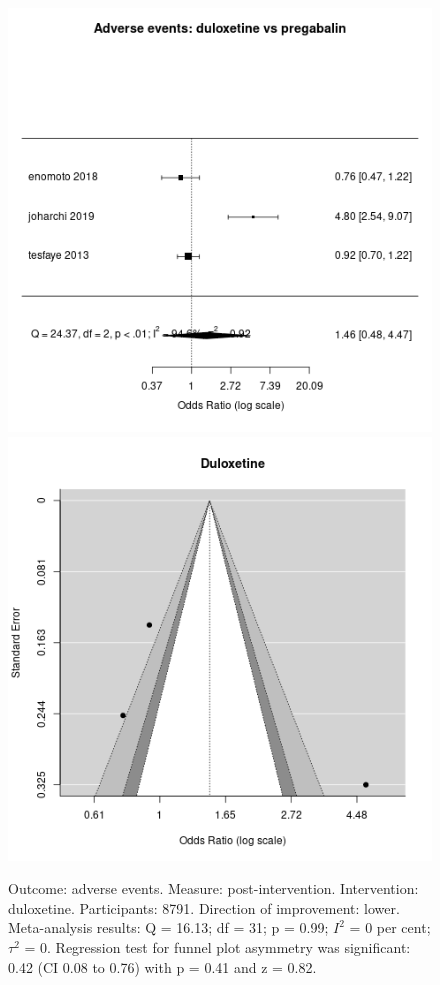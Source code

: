 \documentclass{report}\usepackage[]{graphicx}\usepackage[]{color}
\newenvironment{knitrout}{}{} %
\begin{document}
\begin{figure}

\begin{knitrout}
\color{fgcolor}
\includegraphics[width=0.5\linewidth,height=0.35\textheight]{img/adverse-duloxetine- - -forest} 
\includegraphics[width=0.5\linewidth,height=0.35\textheight]{img/adverse-duloxetine- - -funnel} 
\end{knitrout}

\caption[Adverse events: duloxetine]{Outcome: adverse events. Measure: post-intervention. Intervention: duloxetine. Participants: 8791. Direction of improvement: lower. Meta-analysis results: Q = 16.13; df = 31; p = 0.99; $I^2$ = 0 per cent; $\tau^2$ = 0. Regression test for funnel plot asymmetry was significant: 0.42 (CI 0.08 to 0.76) with p = 0.41 and z = 0.82.}
\label{fig:adverse-dulox}
\end{figure}
\end{document}
